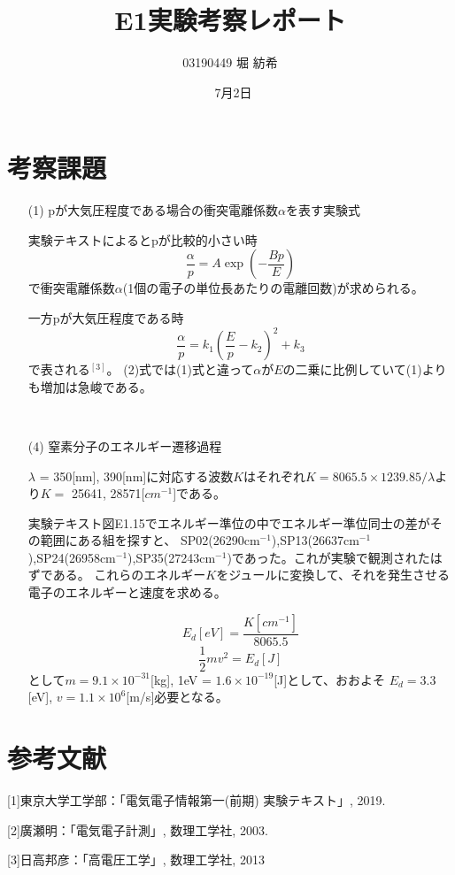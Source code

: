 \documentclass[dvipdfmx]{jsarticle}
\begin{document}
\title{E1実験考察レポート}
\author{03190449  堀 紡希}
\date{\ 7月2日}
\maketitle

\section{考察課題}

\begin{enumerate}
\item[(1)]
pが大気圧程度である場合の衝突電離係数$\alpha$を表す実験式

実験テキストによるとpが比較的小さい時
\begin{equation}
\frac{\alpha}{p} = A\exp{(-\frac{Bp}{E})}
\end{equation}
で衝突電離係数$\alpha$(1個の電子の単位長あたりの電離回数)が求められる。

一方pが大気圧程度である時
\begin{equation}
\frac{\alpha}{p} = k_{1}(\frac{E}{p}-k_{2})^{2}+k_{3}
\end{equation}
で表される$^{[3]}$。
(2)式では(1)式と違って$\alpha$が$E$の二乗に比例していて(1)よりも増加は急峻である。

\
\item[(4)]窒素分子のエネルギー遷移過程

$\lambda$ = 350[nm], 390[nm]に対応する波数$K$はそれぞれ$K = 8065.5 \times 1239.85/ \lambda$より$K =$ 25641, 28571[$cm^{-1}$]である。

実験テキスト図E1.15でエネルギー準位の中でエネルギー準位同士の差がその範囲にある組を探すと、
SP02(26290cm$^{-1}$),SP13(26637cm$^{-1}$),SP24(26958cm$^{-1}$),SP35(27243cm$^{-1}$)であった。これが実験で観測されたはずである。
これらのエネルギー$K$をジュールに変換して、それを発生させる電子のエネルギーと速度を求める。

\[ E_{d}[eV] = \frac{K[cm^{-1}]}{8065.5}\]
\[ \frac{1}{2}mv^{2} = E_{d}[J]\]
として$m = 9.1\times10^{-31}$[kg], 1eV = $1.6\times10^{-19}$[J]として、おおよそ
$E_{d}= 3.3$[eV], $v = 1.1\times10^{6}$[m/s]必要となる。




\end{enumerate}
\section{参考文献}
[1]東京大学工学部：「電気電子情報第一(前期) 実験テキスト」, 2019.

[2]廣瀬明：「電気電子計測」, 数理工学社, 2003.

[3]日高邦彦：「高電圧工学」, 数理工学社, 2013
\end{document}
